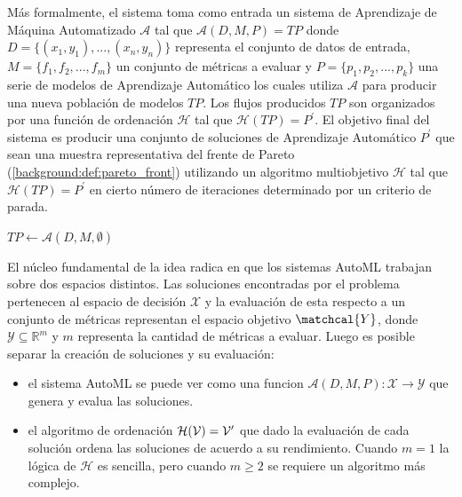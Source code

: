 M\'as formalmente, 
el sistema toma como entrada un sistema de Aprendizaje de M\'aquina Automatizado $\mathcal{A}$ tal que $\mathcal{A}(D, M, P) = TP$ donde $D = \{(x_1, y_1), ..., (x_n, y_n)\}$ representa el conjunto de datos de entrada, $M = \{f_1, f_2, ..., f_m\}$ un conjunto de m\'etricas a evaluar y $P = \{p_1, p_2, ..., p_k\}$ una serie de modelos de Aprendizaje Autom\'atico los cuales utiliza $\mathcal{A}$ para producir una nueva poblaci\'on de modelos $TP$. 
Los flujos producidos $TP$ son organizados por una funci\'on de ordenaci\'on $\mathcal{H}$ tal que $\mathcal{H}(TP) = P^'$. 
El objetivo final del sistema es producir una conjunto de soluciones de Aprendizaje Autom\'atico $P^'$ que sean una muestra representativa del frente de Pareto (\ref{background:def:pareto_front}) utilizando un algoritmo multiobjetivo  $\mathcal{H}$ tal que $\mathcal{H}(TP) = P^'$ en cierto n\'umero de iteraciones determinado por un criterio de parada. 
\begin{algorithm}[ht]\caption{}
    
    $TP \gets \mathcal{A}(D, M, \emptyset)$ 
\end{algorithm}

El n\'ucleo fundamental de la idea radica en que los sistemas AutoML trabajan sobre dos espacios distintos. Las soluciones encontradas por el problema pertenecen al espacio de decisi\'on $\mathcal{X}$ y la evaluaci\'on de esta respecto a un conjunto de m\'etricas representan el espacio objetivo $\matchcal{Y}$, donde $\mathcal{Y} \subseteq \mathbb{R}^m$ y  $m$ representa la cantidad de m\'etricas a evaluar. 
Luego es posible separar la creaci\'on de soluciones y su evaluaci\'on: 
\begin{itemize}
    \item el sistema AutoML se puede ver como una funcion $\mathcal{A}(D, M, P): \mathcal{X} \rightarrow \mathcal{Y}$ que genera y evalua las soluciones.
    \item el algoritmo de ordenaci\'on $\mathcal{H(V) = V'^}$ que dado la evaluaci\'on de cada soluci\'on ordena las soluciones de acuerdo a su rendimiento. Cuando $m = 1$ la l\'ogica de $\mathcal{H}$ es sencilla, pero cuando $m \geq 2$  se requiere un algoritmo m\'as complejo.
\end{itemize}


